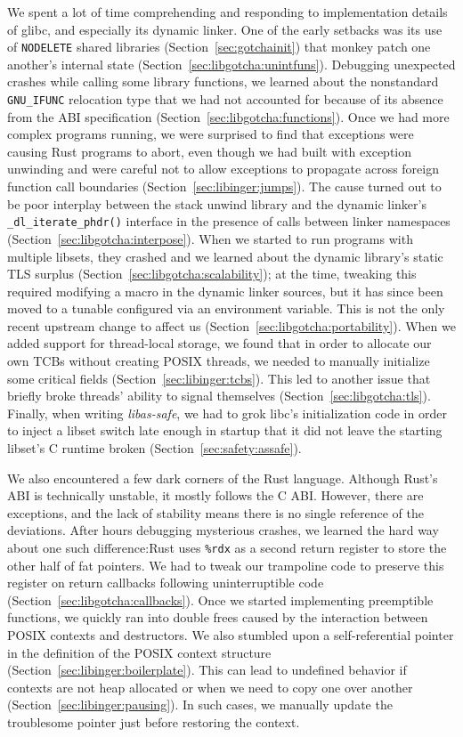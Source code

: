 We spent a lot of time comprehending and responding to implementation details of
glibc, and especially its dynamic linker.  One of the early setbacks was its use of
\texttt{NODELETE} shared libraries (Section~\ref{sec:gotchainit}) that monkey patch
one another's internal state (Section~\ref{sec:libgotcha:unintfuns}).  Debugging
unexpected crashes while calling some library functions, we learned about the
nonstandard \texttt{GNU\_IFUNC} relocation type that we had not accounted for because
of its absence from the ABI specification (Section~\ref{sec:libgotcha:functions}).
Once we had more complex programs running, we were surprised to find that exceptions
were causing Rust programs to abort, even though we had built with exception
unwinding and were careful not to allow exceptions to propagate across foreign
function call boundaries (Section~\ref{sec:libinger:jumps}).  The cause turned out
to be poor interplay between the stack unwind library and the dynamic linker's
\texttt{\_dl\_iterate\_phdr()} interface in the presence of calls between linker
namespaces (Section~\ref{sec:libgotcha:interpose}).  When we started to run programs
with multiple libsets, they crashed and we learned about the dynamic library's static
TLS surplus (Section~\ref{sec:libgotcha:scalability}); at the time, tweaking this
required modifying a macro in the dynamic linker sources, but it has since been moved
to a tunable configured via an environment variable.  This is not the only recent
upstream change to affect us (Section~\ref{sec:libgotcha:portability}).  When we
added support for thread-local storage, we found that in order to allocate our own
TCBs without creating POSIX threads, we needed to manually initialize some critical
fields (Section~\ref{sec:libinger:tcbs}).  This led to another issue that briefly
broke threads' ability to signal themselves (Section~\ref{sec:libgotcha:tls}).
Finally, when writing \textit{libas-safe}, we had to grok libc's initialization code
in order to inject a libset switch late enough in startup that it did not leave the
starting libset's C runtime broken (Section~\ref{sec:safety:assafe}).

We also encountered a few dark corners of the Rust language.  Although Rust's ABI is
technically unstable, it mostly follows the C ABI.  However, there are exceptions,
and the lack of stability means there is no single reference of the deviations.
After hours debugging mysterious crashes, we learned the hard way about one such
difference:\@ Rust uses \texttt{\%rdx} as a second return register to store the other
half of fat pointers.  We had to tweak our trampoline code to preserve this register
on return callbacks following uninterruptible code
(Section~\ref{sec:libgotcha:callbacks}).  Once we started implementing preemptible
functions, we quickly ran into double frees caused by the interaction between POSIX
contexts and destructors.  We also stumbled upon a self-referential pointer in the
definition of the POSIX context structure (Section~\ref{sec:libinger:boilerplate}).
This can lead to undefined behavior if contexts are not heap
allocated or when we need to copy one over another
(Section~\ref{sec:libinger:pausing}).  In such cases, we manually update the
troublesome pointer just before restoring the context.

